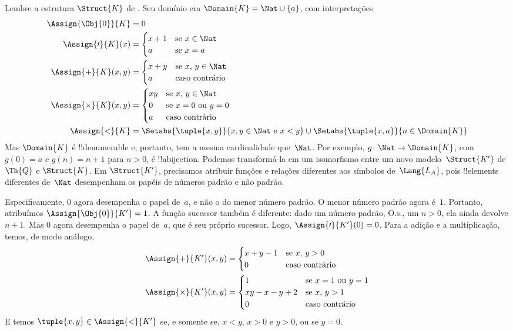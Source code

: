 \documentclass[../../../include/open-logic-section]{subfiles}
\begin{document}
\begin{ex}
Lembre a estrutura $\Struct{K}$ de .
Seu domínio era $\Domain{K} = \Nat
\cup \{a\}$, com interpretações
\begin{align*}
  \Assign{\Obj{0}}{K} & = 0\\
  \Assign{\prime}{K}(x) & =
  \begin{cases}
    x+1 & \text{se $x\in \Nat$}\\
    a & \text{se $x = a$}
  \end{cases}\\
  \Assign{+}{K}(x, y) & =
  \begin{cases}
    x+y & \text{se $x$, $y \in\Nat$}\\
    a & \text{caso contrário}
  \end{cases}\\
  \Assign{\times}{K}(x, y) & =
  \begin{cases}
    xy & \text{se $x$, $y \in\Nat$}\\
    0 & \text{se $x=0$ ou $y=0$}\\
    a & \text{caso contrário}\\
  \end{cases}\\
  \Assign{<}{K} & =
  \Setabs{\tuple{x,y}}{x, y \in \Nat \text{ e } x<y} \cup
  \Setabs{\tuple{x,a}}{n \in \Domain{K}}
\end{align*}
Mas $\Domain{K}$ é !!{denumerable} e, portanto, tem a mesma cardinalidade
que~$\Nat$. Por exemplo, $g\colon \Nat \to \Domain{K}$, com $g(0) = a$
e $g(n) = n+1$ para $n>0$, é !!a{bijection}. Podemos transformá-la em
um isomorfismo entre um novo modelo~$\Struct{K'}$ de~$\Th{Q}$ e
$\Struct{K}$. Em $\Struct{K'}$, precisamos atribuir funções e relações
diferentes aos símbolos de~$\Lang{L_A}$, pois !!{element}s diferentes
de~$\Nat$ desempenham os papéis de números padrão e não padrão.

Especificamente, $0$ agora desempenha o papel de~$a$, e não o do menor
número padrão. O menor número padrão agora é~$1$. Portanto, atribuímos
$\Assign{\Obj{0}}{K'} = 1$. A função sucessor também é diferente:
dado um número padrão, O.s.\@, um $n > 0$, ela ainda devolve $n+1$.
Mas $0$ agora desempenha o papel de~$a$, que é seu próprio sucessor.
Logo, $\Assign{\prime}{K'}(0) = 0$. Para a adição e a multiplicação,
temos, de modo análogo,
\begin{align*}
\Assign{+}{K'}(x, y) & =
  \begin{cases}
    x+y-1 & \text{se $x$, $y >0$}\\
    0 & \text{caso contrário}
  \end{cases}\\
  \Assign{\times}{K'}(x, y) & =
  \begin{cases}
    1 & \text{se $x = 1$ ou $y = 1$}\\
    xy - x - y + 2 & \text{se $x$, $y > 1$}\\
    0 & \text{caso contrário}\\
  \end{cases}
\end{align*}
E temos $\tuple{x, y} \in \Assign{<}{K'}$ se, e somente se, $x < y$,
$x > 0$ e $y > 0$, ou se $y = 0$.


\end{ex}
\end{document}
